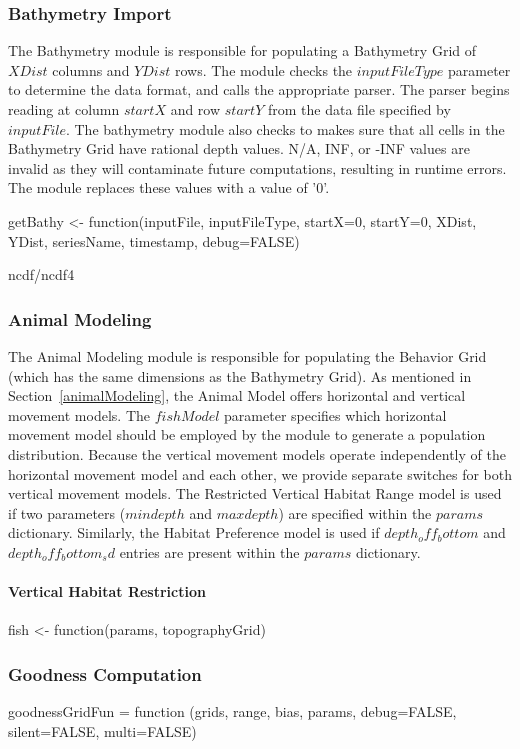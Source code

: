 \subsubsection{Bathymetry Import}
The Bathymetry module is responsible for populating a Bathymetry Grid of $XDist$ columns and $YDist$ rows.  The module checks the $inputFileType$ parameter to determine the data format, and calls the appropriate parser.  The parser begins reading at column $startX$ and row $startY$ from the data file specified by $inputFile$.  The bathymetry module also checks to makes sure that all cells in the Bathymetry Grid have rational depth values.  N/A, INF, or -INF values are invalid as they will contaminate future computations, resulting in runtime errors.  The module replaces these values with a value of '0'.  

getBathy <- function(inputFile, inputFileType, startX=0, startY=0, XDist, YDist, seriesName, timestamp, debug=FALSE) {
	ncdf/ncdf4
	
\subsubsection{Animal Modeling}
The Animal Modeling module is responsible for populating the Behavior Grid (which has the same dimensions as the Bathymetry Grid).  As mentioned in Section~\ref{animalModeling}, the Animal Model offers horizontal and vertical movement models.  The $fishModel$ parameter specifies which horizontal movement model should be employed by the module to generate a population distribution.  Because the vertical movement models operate independently of the horizontal movement model and each other, we provide separate switches for both vertical movement models.  The Restricted Vertical Habitat Range model is used if two parameters ($mindepth$ and $maxdepth$) are specified within the $params$ dictionary.  Similarly, the Habitat Preference model is used if $depth_off_bottom$ and $depth_off_bottom_sd$ entries are present  within the $params$ dictionary.

\paragraph{Vertical Habitat Restriction}


 fish <- function(params, topographyGrid) {

\subsubsection{Goodness Computation}
goodnessGridFun = function (grids, range, bias, params, debug=FALSE, silent=FALSE, multi=FALSE) 

}}
